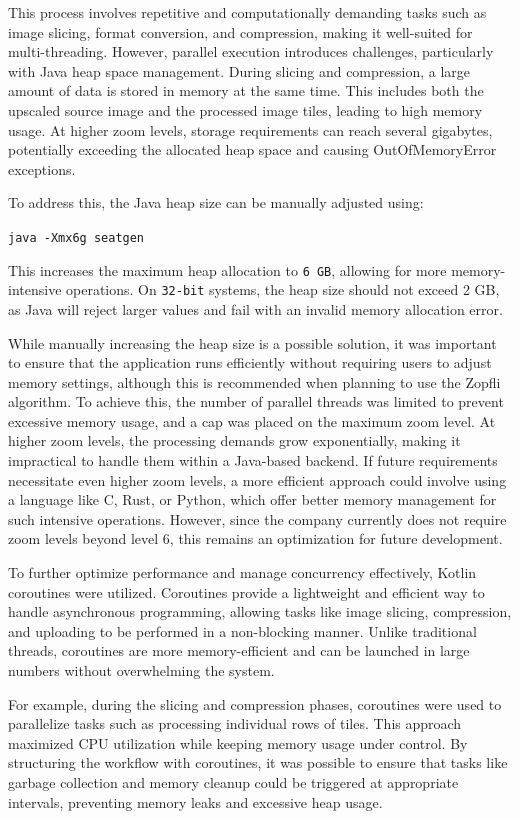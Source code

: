 This process involves repetitive and computationally demanding tasks such as image slicing, format conversion, and compression, making it well-suited for multi-threading. However, parallel execution introduces challenges, particularly with Java heap space management. During slicing and compression, a large amount of data is stored in memory at the same time. This includes both the upscaled source image and the processed image tiles, leading to high memory usage. At higher zoom levels, storage requirements can reach several gigabytes, potentially exceeding the allocated heap space and causing OutOfMemoryError exceptions.

To address this, the Java heap size can be manually adjusted using:

\texttt{java -Xmx6g seatgen}

This increases the maximum heap allocation to \texttt{6 GB}, allowing for more memory-intensive operations. On \texttt{32-bit} systems, the heap size should not exceed 2 GB, as Java will reject larger values and fail with an invalid memory allocation error.

While manually increasing the heap size is a possible solution, it was important to ensure that the application runs efficiently without requiring users to adjust memory settings, although this is recommended when planning to use the Zopfli algorithm. To achieve this, the number of parallel threads was limited to prevent excessive memory usage, and a cap was placed on the maximum zoom level. At higher zoom levels, the processing demands grow exponentially, making it impractical to handle them within a Java-based backend. If future requirements necessitate even higher zoom levels, a more efficient approach could involve using a language like C, Rust, or Python, which offer better memory management for such intensive operations. However, since the company currently does not require zoom levels beyond level 6, this remains an optimization for future development.

To further optimize performance and manage concurrency effectively, Kotlin coroutines were utilized. Coroutines provide a lightweight and efficient way to handle asynchronous programming, allowing tasks like image slicing, compression, and uploading to be performed in a non-blocking manner. Unlike traditional threads, coroutines are more memory-efficient and can be launched in large numbers without overwhelming the system.

For example, during the slicing and compression phases, coroutines were used to parallelize tasks such as processing individual rows of tiles. This approach maximized CPU utilization while keeping memory usage under control. By structuring the workflow with coroutines, it was possible to ensure that tasks like garbage collection and memory cleanup could be triggered at appropriate intervals, preventing memory leaks and excessive heap usage.

